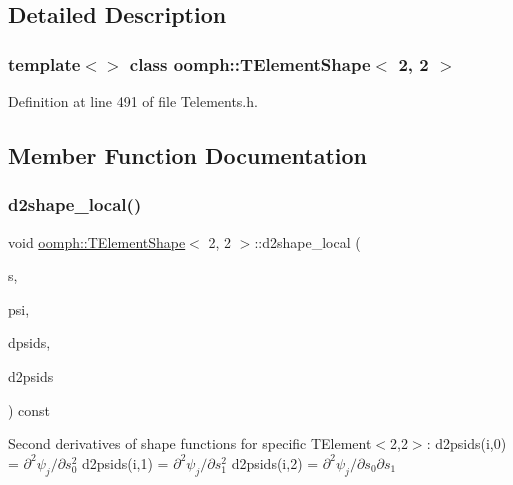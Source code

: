\subsection{Detailed Description}
\subsubsection*{template$<$$>$\newline
class oomph\+::\+T\+Element\+Shape$<$ 2, 2 $>$}



Definition at line 491 of file Telements.\+h.



\subsection{Member Function Documentation}
\mbox{\label{classoomph_1_1TElementShape_3_012_00_012_01_4_aab482c9a8774c643051608ad2da3bc32}} 
\subsubsection{\texorpdfstring{d2shape\+\_\+local()}{d2shape\_local()}}
{\footnotesize\ttfamily void \hyperlink{classoomph_1_1TElementShape}{oomph\+::\+T\+Element\+Shape}$<$ 2, 2 $>$\+::d2shape\+\_\+local (\begin{DoxyParamCaption}\item[{const \hyperlink{classoomph_1_1Vector}{Vector}$<$ double $>$ \&}]{s,  }\item[{\hyperlink{classoomph_1_1Shape}{Shape} \&}]{psi,  }\item[{\hyperlink{classoomph_1_1DShape}{D\+Shape} \&}]{dpsids,  }\item[{\hyperlink{classoomph_1_1DShape}{D\+Shape} \&}]{d2psids }\end{DoxyParamCaption}) const\hspace{0.3cm}{\ttfamily [inline]}}

Second derivatives of shape functions for specific T\+Element$<$2,2$>$\+: d2psids(i,0) = $ \partial^2 \psi_j / \partial s_0^2 $ d2psids(i,1) = $ \partial^2 \psi_j / \partial s_1^2 $ d2psids(i,2) = $ \partial^2 \psi_j / \partial s_0 \partial s_1 $ 

